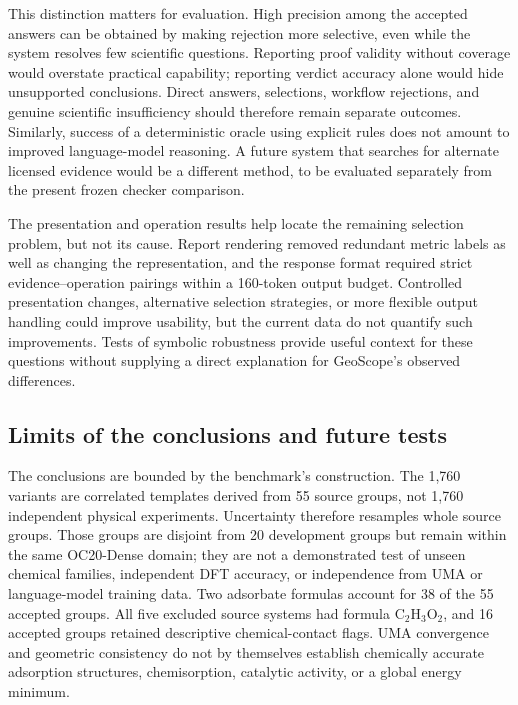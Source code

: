 This distinction matters for evaluation. High precision among the accepted answers can be obtained by making rejection more selective, even while the system resolves few scientific questions. Reporting proof validity without coverage would overstate practical capability; reporting verdict accuracy alone would hide unsupported conclusions. Direct answers, selections, workflow rejections, and genuine scientific insufficiency should therefore remain separate outcomes. Similarly, success of a deterministic oracle using explicit rules does not amount to improved language-model reasoning. A future system that searches for alternate licensed evidence would be a different method, to be evaluated separately from the present frozen checker comparison.

The presentation and operation results help locate the remaining selection problem, but not its cause. Report rendering removed redundant metric labels as well as changing the representation, and the response format required strict evidence--operation pairings within a 160-token output budget. Controlled presentation changes, alternative selection strategies, or more flexible output handling could improve usability, but the current data do not quantify such improvements. Tests of symbolic robustness provide useful context for these questions without supplying a direct explanation for GeoScope's observed differences.\cite{mirzadeh2025gsm}

\subsection{Limits of the conclusions and future tests}

The conclusions are bounded by the benchmark's construction. The 1,760 variants are correlated templates derived from 55 source groups, not 1,760 independent physical experiments. Uncertainty therefore resamples whole source groups. Those groups are disjoint from 20 development groups but remain within the same OC20-Dense domain; they are not a demonstrated test of unseen chemical families, independent DFT accuracy, or independence from UMA or language-model training data. Two adsorbate formulas account for 38 of the 55 accepted groups. All five excluded source systems had formula C$_2$H$_3$O$_2$, and 16 accepted groups retained descriptive chemical-contact flags. UMA convergence and geometric consistency do not by themselves establish chemically accurate adsorption structures, chemisorption, catalytic activity, or a global energy minimum.

